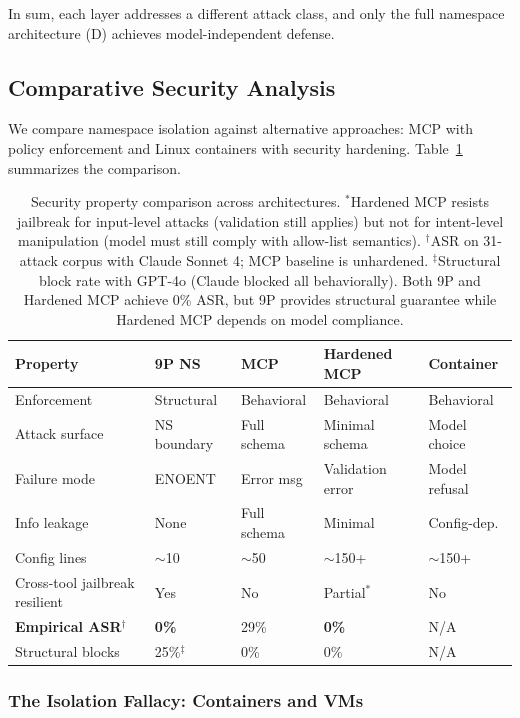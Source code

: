 \documentclass{article}
\begin{document}
In sum, each layer addresses a different attack class, and only the full namespace architecture (D) achieves model-independent defense.

\subsection{Comparative Security Analysis}

We compare namespace isolation against alternative approaches: MCP with policy enforcement and Linux containers with security hardening. Table~\ref{tab:comparative} summarizes the comparison.

\begin{table}[h]
\centering
\small
\begin{tabular}{p{2.2cm}p{1.5cm}p{1.5cm}p{1.5cm}p{1.5cm}}
\hline
\textbf{Property} & \textbf{9P NS} & \textbf{MCP} & \textbf{Hardened MCP} & \textbf{Container} \\
\hline
Enforcement & Structural & Behavioral & Behavioral & Behavioral \\
Attack surface & NS boundary & Full schema & Minimal schema & Model choice \\
Failure mode & ENOENT & Error msg & Validation error & Model refusal \\
Info leakage & None & Full schema & Minimal & Config-dep. \\
Config lines & $\sim$10 & $\sim$50 & $\sim$150+ & $\sim$150+ \\
Cross-tool jailbreak resilient & Yes & No & Partial$^*$ & No \\
\textbf{Empirical ASR$^\dagger$} & \textbf{0\%} & 29\% & \textbf{0\%} & N/A \\
Structural blocks & 25\%$^\ddagger$ & 0\% & 0\% & N/A \\
\hline
\end{tabular}
\caption{Security property comparison across architectures. $^*$Hardened MCP resists jailbreak for input-level attacks (validation still applies) but not for intent-level manipulation (model must still comply with allow-list semantics). $^\dagger$ASR on 31-attack corpus with Claude Sonnet 4; MCP baseline is unhardened. $^\ddagger$Structural block rate with GPT-4o (Claude blocked all behaviorally). Both 9P and Hardened MCP achieve 0\% ASR, but 9P provides structural guarantee while Hardened MCP depends on model compliance.}
\label{tab:comparative}
\end{table}

\subsubsection{The Isolation Fallacy: Containers and VMs}
\end{document}
